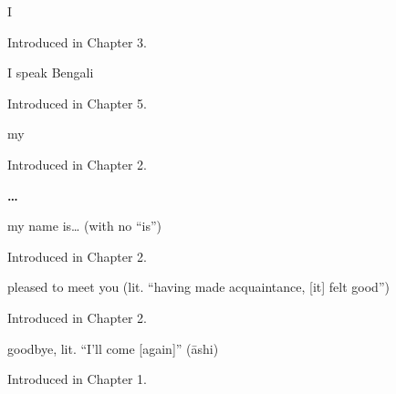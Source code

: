 \noindent\begin{minipage}[t]{\linewidth}
\raggedright
\textbf{}\par
\small I\par
\footnotesize Introduced in Chapter 3.
\end{minipage}\par\medskip

\noindent\begin{minipage}[t]{\linewidth}
\raggedright
\textbf{  }\par
\small I speak Bengali\par
\footnotesize Introduced in Chapter 5.
\end{minipage}\par\medskip

\noindent\begin{minipage}[t]{\linewidth}
\raggedright
\textbf{}\par
\small my\par
\footnotesize Introduced in Chapter 2.
\end{minipage}\par\medskip

\noindent\begin{minipage}[t]{\linewidth}
\raggedright
\textbf{  …}\par
\small my name is… (with no \textquotedblleft{}is\textquotedblright{})\par
\footnotesize Introduced in Chapter 2.
\end{minipage}\par\medskip

\noindent\begin{minipage}[t]{\linewidth}
\raggedright
\textbf{   }\par
\small pleased to meet you (lit. \textquotedblleft{}having made acquaintance, {[}it{]} felt good\textquotedblright{})\par
\footnotesize Introduced in Chapter 2.
\end{minipage}\par\medskip

\noindent\begin{minipage}[t]{\linewidth}
\raggedright
\textbf{}\par
\small goodbye, lit. \textquotedblleft{}I'll come {[}again{]}\textquotedblright{} (āshi)\par
\footnotesize Introduced in Chapter 1.
\end{minipage}\par\medskip

